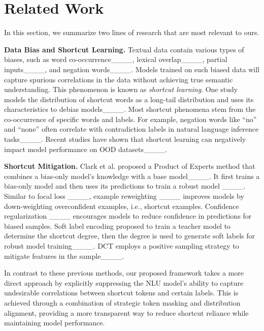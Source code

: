 \section{Related Work}
\vspace{3ex}
In this section, we summarize two lines of research that are most relevant to ours.

\noindent\textbf{Data Bias and Shortcut Learning.}\quad
Textual data contain various types of biases, such as word co-occurrence____, lexical overlap____, partial inputs____, and negation words____.
Models trained on such biased data will capture spurious correlations in the data without achieving true semantic understanding. This phenomenon is known as \emph{shortcut learning}.
One study models the distribution of shortcut words as a long-tail distribution and uses its characteristics to debias models____.
Most shortcut phenomena stem from the co-occurrence of specific words and labels. For example, negation words like ``no'' and ``none'' often correlate with contradiction labels in natural language inference tasks____.
Recent studies have shown that shortcut learning can negatively impact model performance on OOD datasets____.

\vspace{2pt}
\noindent \textbf{Shortcut Mitigation.}\quad 
Clark et al. proposed a Product of Experts method that combines a bias-only model's knowledge with a base model____. It first trains a bias-only model and then uses its predictions to train a robust model ____.
Similar to focal loss ____, example reweighting ____ improves models by down-weighting overconfident examples, i.e., shortcut examples.
Confidence regularization ____ encourages models to reduce confidence in predictions for biased samples.
Soft label encoding proposed to train a teacher model to determine the shortcut degree, then the degree is used to generate soft labels for robust model training____. DCT employs a positive sampling
strategy to mitigate features in the sample____.

In contrast to these previous methods, our proposed framework takes a more direct approach by explicitly suppressing the NLU model's ability to capture undesirable correlations between shortcut tokens and certain labels. This is achieved through a combination of strategic token masking and distribution alignment, providing a more transparent way to reduce shortcut reliance while maintaining model performance.